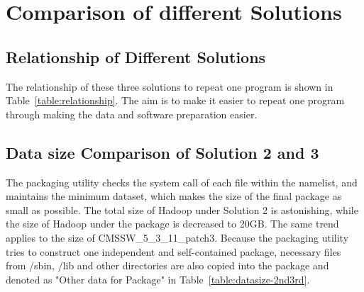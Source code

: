 \documentclass{acm_proc_article-sp}
\begin{document}


\section{Comparison of different Solutions}
\subsection{Relationship of Different Solutions}
The relationship of these three solutions to repeat one program is shown in Table~\ref{table:relationship}. The aim is to make it easier to repeat one program through making the data and software preparation easier.

\subsection{ Data size Comparison of Solution 2 and 3}

The packaging utility checks the system call of each file within the namelist,
and maintains the minimum dataset, which makes the size of the final package 
as small as possible. The total size of Hadoop under Solution 2 is astonishing,
while the size of Hadoop under the package is decreased to 20GB. The same trend
applies to the size of CMSSW\_5\_3\_11\_patch3. Because the packaging utility
tries to construct one independent and self-contained package, necessary files
from /sbin, /lib and other directories are also copied into the package and
denoted as "Other data for Package" in Table~\ref{table:datasize-2nd3rd}.
\end{document}
